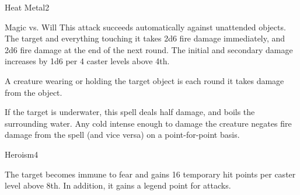 \begin{spellsection}{Heat Metal}{2}
\begin{spellheader}
\end{spellheader}
\begin{spellcontent}
    \begin{spelltargetinginfo}
    \end{spelltargetinginfo}
    \begin{spelleffects}
        \begin{spellattack}{Magic vs. Will}
            \spellspecial This attack succeeds automatically against unattended objects.
            \spellsuccess The target and everything touching it takes 2d6 fire damage immediately, and 2d6 fire damage at the end of the next round. The initial and secondary damage increases by 1d6 per 4 caster levels above 4th.

            A creature wearing or holding the target object is \dazed each round it takes damage from the object.
        \end{spellattack}
    \end{spelleffects}
\end{spellcontent}
\begin{spellfooter}
    \spellnotes If the target is underwater, this spell deals half damage, and boils the surrounding water. Any cold intense enough to damage the creature negates fire damage from the spell (and vice versa) on a point-for-point basis.
\end{spellfooter}
\end{spellsection}

\begin{spellsection}{Heroism}{4}
\begin{spellheader}
\end{spellheader}
\begin{spellcontent}
    \begin{spelltargetinginfo}
    \end{spelltargetinginfo}
    \begin{spelleffects}
        \spelleffect The target becomes immune to fear and gains 16 temporary hit points  per caster level above 8th. In addition, it gains a legend point for attacks.
        \spelldur \durshort \dismissable
    \end{spelleffects}
\end{spellcontent}
\begin{spellfooter}
\end{spellfooter}
\end{spellsection}

